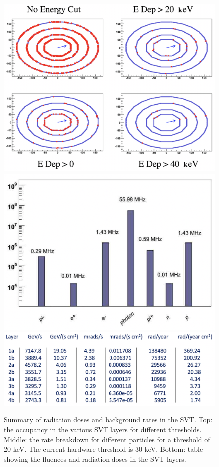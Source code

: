 \begin{figure}
	\centering
	\includegraphics[width=0.95\columnwidth,keepaspectratio]{img/bstHitDisplay.png}
	\includegraphics[width=0.95\columnwidth,keepaspectratio]{img/bstRates.png}
	\includegraphics[width=0.95\columnwidth,keepaspectratio]{img/bstRadSummary.png}
	\caption{Summary of radiation doses and background rates in the SVT. Top: the occupancy in the various SVT layers
            for different thresholds. Middle: the rate breakdown for different particles for a threshold of 20 keV.
            The current hardware threshold is 30 keV. Bottom: table showing the fluences and radiation doses in the SVT
            layers. }
	\label{fig:radStudy}
\end{figure}



